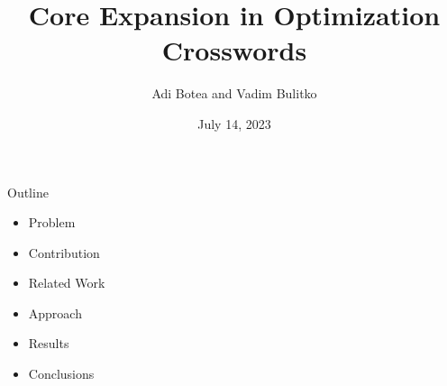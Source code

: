 \documentclass[aspectratio=169,usenames,dvipsnames]{beamer}
\newcommand{\bei}{\begin{itemize}}
\newcommand{\eei}{\end{itemize}}
\newcommand{\ie}{\item}
\numberwithin{equation}{section}
\numberwithin{theorem}{section}
\numberwithin{lem}{section}
\numberwithin{df}{section}
\begin{document}
\title{Core Expansion in Optimization Crosswords}
\author{Adi Botea and Vadim Bulitko}

\date{July 14, 2023}

\frame{\titlepage} 


\begin{frame}{Outline}

\bei

\ie Problem

\bigskip

\ie Contribution

\bigskip

\ie Related Work

\bigskip

\ie Approach

\bigskip

\ie Results

\bigskip

\ie Conclusions

\eei

\end{frame}

\end{document}
